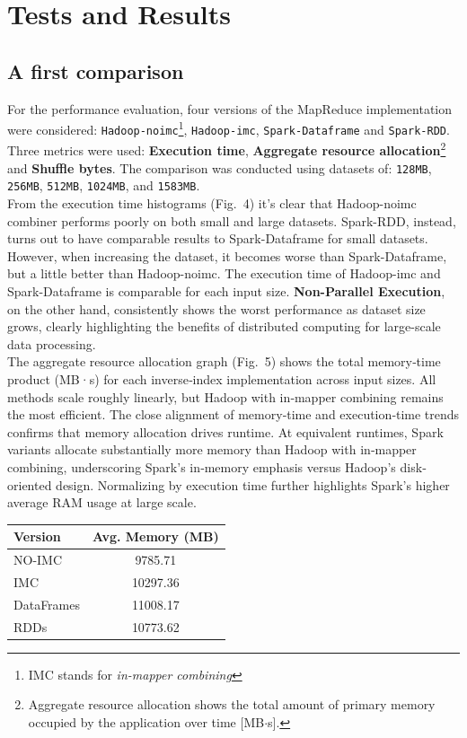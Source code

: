 \section{Tests and Results}

\subsection{A first comparison}
For the performance evaluation, four versions of the MapReduce implementation were considered: 
\texttt{Hadoop-noimc}\footnote{IMC stands for \textit{in-mapper combining}}, 
\texttt{Hadoop-imc}, \texttt{Spark-Dataframe} and \texttt{Spark-RDD}. Three metrics were used: \textbf{Execution time}, \textbf{Aggregate resource allocation}\footnote{Aggregate resource allocation shows the total amount of primary memory occupied by the application over time [MB$\cdot$s].} and \textbf{Shuffle bytes}. The comparison was conducted using datasets of: 
\texttt{128MB}, \texttt{256MB}, \texttt{512MB}, \texttt{1024MB}, and \texttt{1583MB}.\\
From the execution time histograms (Fig.~4) it's clear that Hadoop-noimc combiner performs poorly on both small and large datasets. Spark-RDD, instead, turns out to have comparable results to Spark-Dataframe for small datasets. However, when increasing the dataset, it becomes worse than Spark-Dataframe, but a little better than Hadoop-noimc. The execution time of Hadoop-imc and Spark-Dataframe is comparable for each input size. \textbf{Non-Parallel Execution}, on the other hand, consistently shows the worst performance as dataset size grows, clearly highlighting the benefits of distributed computing for large-scale data processing.\\
The aggregate resource allocation graph (Fig.~5) shows the total memory‐time product (MB·s) for each inverse‐index implementation across input sizes. All methods scale roughly linearly, but Hadoop with in‐mapper combining remains the most efficient. The close alignment of memory‐time and execution‐time trends confirms that memory allocation drives runtime. At equivalent runtimes, Spark variants allocate substantially more memory than Hadoop with in‐mapper combining, underscoring Spark's in‐memory emphasis versus Hadoop's disk‐oriented design. Normalizing by execution time further highlights Spark’s higher average RAM usage at large scale. 
\begin{table}[H]
	\centering
	\begin{tabular}{lc}
		\hline
		\textbf{Version} & \textbf{Avg. Memory (MB)} \\
		\hline
		NO-IMC    & 9785.71 \\
		IMC  & 10297.36 \\
		DataFrames & 11008.17 \\
		RDDs       & 10773.62 \\
		\hline
	\end{tabular}
	\label{tab:avg-mem}
\end{table}
